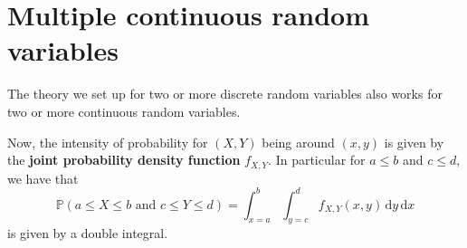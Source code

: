 \documentclass[
  a4paper,
]{book}
\theoremstyle{definition}
\theoremstyle{definition}
\theoremstyle{definition}
\theoremstyle{definition}
\theoremstyle{remark}
\begin{document}
\hypertarget{continuous-multiple}{%
\section{Multiple continuous random variables}\label{continuous-multiple}}

The theory we set up for two or more discrete random variables also works for two or more continuous random variables.

Now, the intensity of probability for \((X,Y)\) being around \((x,y)\) is given by the \textbf{joint probability density function} \(f_{X,Y}\). In particular for \(a \leq b\) and \(c \leq d\), we have that
\[ \mathbb P(a \leq X \leq b \text{ and } c \leq Y \leq d ) = \int_{x = a}^b \int_{y = c}^d f_{X,Y}(x,y)\, \mathrm dy \,\mathrm dx  \]
is given by a double integral.
\end{document}
